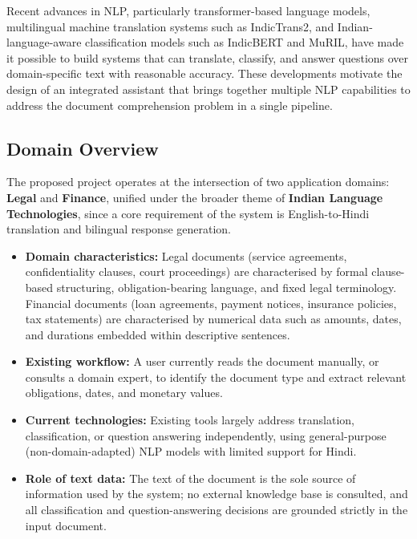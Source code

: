 Recent advances in NLP, particularly transformer-based language models, multilingual machine translation systems such as IndicTrans2, and Indian-language-aware classification models such as IndicBERT and MuRIL, have made it possible to build systems that can translate, classify, and answer questions over domain-specific text with reasonable accuracy. These developments motivate the design of an integrated assistant that brings together multiple NLP capabilities to address the document comprehension problem in a single pipeline.


\subsection{Domain Overview}

The proposed project operates at the intersection of two application domains: \textbf{Legal} and \textbf{Finance}, unified under the broader theme of \textbf{Indian Language Technologies}, since a core requirement of the system is English-to-Hindi translation and bilingual response generation.

\begin{itemize}
    \item \textbf{Domain characteristics:} Legal documents (service agreements, confidentiality clauses, court proceedings) are characterised by formal clause-based structuring, obligation-bearing language, and fixed legal terminology. Financial documents (loan agreements, payment notices, insurance policies, tax statements) are characterised by numerical data such as amounts, dates, and durations embedded within descriptive sentences.
    \item \textbf{Existing workflow:} A user currently reads the document manually, or consults a domain expert, to identify the document type and extract relevant obligations, dates, and monetary values.
    \item \textbf{Current technologies:} Existing tools largely address translation, classification, or question answering independently, using general-purpose (non-domain-adapted) NLP models with limited support for Hindi.
    \item \textbf{Role of text data:} The text of the document is the sole source of information used by the system; no external knowledge base is consulted, and all classification and question-answering decisions are grounded strictly in the input document.
\end{itemize}

